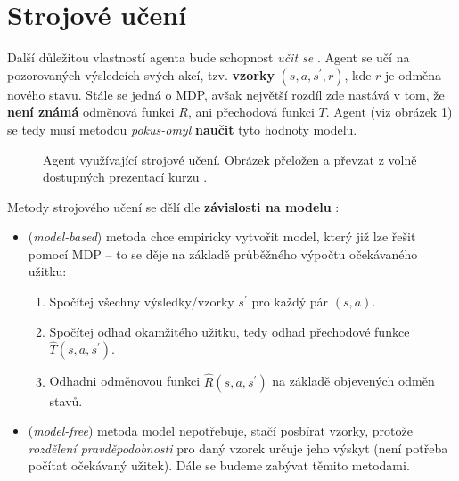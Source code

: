 \section{Strojové učení}
\label{sec:rl}
Další důležitou vlastností agenta bude schopnost \textit{učit se} \cite{RLIntro}. Agent se učí na pozorovaných výsledcích svých akcí, tzv. \textbf{vzorky} $(s,a,s^\prime,r)$, kde $r$ je odměna nového stavu. Stále se jedná o MDP, avšak největší rozdíl zde nastává v tom, že \textbf{není známá} odměnová funkci $R$, ani přechodová funkci $T$. Agent (viz obrázek \ref{img:learningagent}) se tedy musí metodou \textit{pokus-omyl} \textbf{naučit} tyto hodnoty modelu.

\begin{figure}[!htbp]
\begin{center}
  \caption{Agent využívající strojové učení. Obrázek přeložen a převzat z volně dostupných prezentací kurzu \cite{berkeley}.}
  \label{img:learningagent}
\end{center}
\end{figure}

Metody strojového učení se dělí dle \textbf{závislosti na modelu} \cite{RLIntro} \cite{reifreview}:
\begin{itemize}
\item (\textit{model-based}) metoda chce empiricky vytvořit model, který již lze řešit pomocí MDP -- to se děje na základě průběžného výpočtu očekávaného užitku: 
\begin{enumerate}
\item Spočítej všechny výsledky/vzorky $s^\prime$ pro každý pár $(s,a)$.
\item Spočítej odhad okamžitého užitku, tedy odhad přechodové funkce $\hat{T}(s,a,s^\prime)$.
\item Odhadni odměnovou funkci $\hat{R}(s,a,s^\prime)$ na základě objevených odměn stavů.
\end{enumerate}
\item (\textit{model-free}) metoda model nepotřebuje, stačí posbírat vzorky, protože \textit{rozdělení pravděpodobnosti} pro daný vzorek určuje jeho výskyt (není potřeba počítat očekávaný užitek). Dále se budeme zabývat těmito metodami.
\end{itemize}

